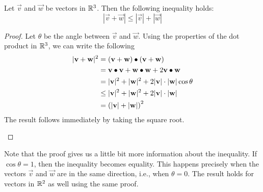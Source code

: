 \documentclass[handout]{ximera}
\begin{document}
\begin{proposition}
Let $\vec{v}$ and $\vec{w}$ be vectors in $\mathbb R^3$. Then the following inequality holds:
\[
|\vec{v} + \vec{w}| \leq |\vec{v}| +|\vec{w}| 
\]



\begin{proof}
Let $\theta$ be the angle between $\vec v$ and $\vec w$. Using the properties of the dot product in $\mathbb R^3$, we can write the following
\begin{align*}
|\mathbf{v} + \mathbf{w}|^2 &= \left(\mathbf{v} + \mathbf{w}\right) \bullet \left(\mathbf{v} + \mathbf{w}\right)\\
                        &= \mathbf{v} \bullet \mathbf{v} + \mathbf{w}\bullet \mathbf{w} + 2\mathbf{v} \bullet \mathbf{w}\\
                        &= |\mathbf{v}|^2 +|\mathbf{w}|^2 + 2|\mathbf{v}|\cdot |\mathbf{w}| \cos \theta\\
                        &\leq |\mathbf{v}|^2 +|\mathbf{w}|^2 + 2|\mathbf{v}|\cdot |\mathbf{w}|\\
                        &= \left(|\mathbf{v}| + |\mathbf{w}|\right)^2
\end{align*}
The result follows immediately by taking the square root.
          
\begin{image}
\end{image}

              
\end{proof}

\end{proposition}

Note that the proof gives us a little bit more information about the inequality. 
If $\cos \theta = 1$, then the inequality becomes equality.  This happens precisely 
when the vectors $\vec{v}$ and $\vec{w}$ are in the same direction, i.e., when $\theta = 0$. 
The result holds for vectors in $\mathbb R^2$ as well using the same proof.
\end{document}
